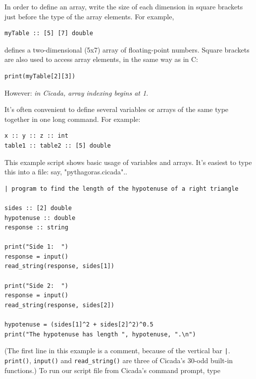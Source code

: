 \documentclass{article}
\newenvironment{code}{
       \begin{list}{}{
               \setlength{\leftmargin}{.4in}
               \setlength{\rightmargin}{0in}
               \setlength{\topsep}{.2in}
       }
       \small
       \item[] }
       { \end{list}   }
\begin{document}
In order to define an array, write the size of each dimension in square brackets just before the type of the array elements.  For example,

\begin{code} \begin{verbatim}
myTable :: [5] [7] double
\end{verbatim} \end{code}

\noindent defines a two-dimensional (5x7) array of floating-point numbers.  Square brackets are also used to access array elements, in the same way as in C:

\begin{code} \begin{verbatim}
print(myTable[2][3])
\end{verbatim} \end{code}

\noindent However:  \emph{in Cicada, array indexing begins at 1}.

It's often convenient to define several variables or arrays of the same type together in one long command.  For example:

\begin{code} \begin{verbatim}
x :: y :: z :: int
table1 :: table2 :: [5] double
\end{verbatim} \end{code}

This example script shows basic usage of variables and arrays.  It's easiest to type this into a file: say, "pythagoras.cicada"..

\begin{code} \begin{verbatim}
| program to find the length of the hypotenuse of a right triangle

sides :: [2] double
hypotenuse :: double
response :: string

print("Side 1:  ")
response = input()
read_string(response, sides[1])

print("Side 2:  ")
response = input()
read_string(response, sides[2])

hypotenuse = (sides[1]^2 + sides[2]^2)^0.5
print("The hypotenuse has length ", hypotenuse, ".\n")
\end{verbatim} \end{code}

\noindent (The first line in this example is a comment, because of the vertical bar \verb#|#.  \verb#print()#, \verb#input()# and \verb#read_string()# are three of Cicada's 30-odd built-in functions.)  To run our script file from Cicada's command prompt, type
\end{document}
